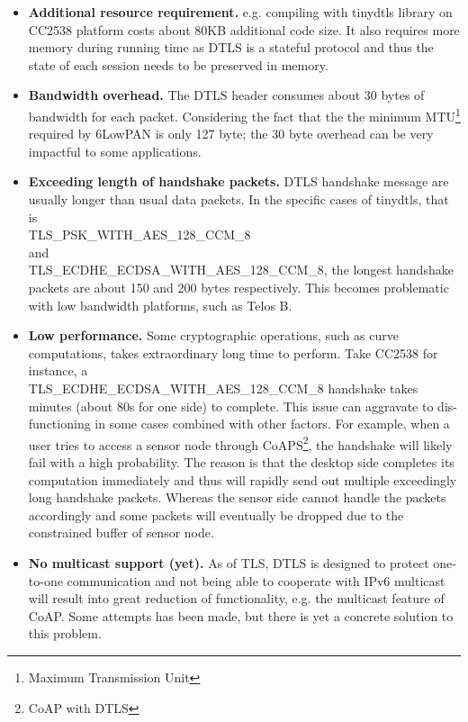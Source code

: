 \begin{itemize}
\item \textbf{Additional resource requirement.} e.g. compiling with tinydtls library on CC2538 platform costs about 80KB additional code size. It also requires more memory during running time as DTLS is a stateful protocol and thus the state of each session needs to be preserved in memory.
\item \textbf{Bandwidth overhead.} The DTLS header consumes about 30 bytes of bandwidth for each packet. Considering the fact that the the minimum MTU\footnote{Maximum Transmission Unit} required by 6LowPAN is only 127 byte; the 30 byte overhead can be very impactful to some applications. 
\item \textbf{Exceeding length of handshake packets.} DTLS handshake message are usually longer than usual data packets. In the specific cases of tinydtls, that is\\ TLS\_PSK\_WITH\_AES\_128\_CCM\_8 \\
and \\
TLS\_ECDHE\_ECDSA\_WITH\_AES\_128\_CCM\_8, the longest handshake packets are about 150 and 200 bytes respectively. This becomes problematic with low bandwidth platforms, such as Telos B.
\item\textbf{Low performance.} Some cryptographic operations, such as curve computations, takes extraordinary long time to perform. Take  CC2538 for instance, a \\ TLS\_ECDHE\_ECDSA\_WITH\_AES\_128\_CCM\_8 handshake takes minutes (about 80s for one side) to complete. This issue can aggravate to dis-functioning in some cases combined with other factors. For example, when a user tries to access a sensor node through CoAPS\footnote{CoAP with DTLS}, the handshake will likely fail with a high probability. The reason is that the desktop side completes its computation immediately and thus will rapidly send out multiple exceedingly long handshake packets. Whereas the sensor side cannot handle the packets accordingly and some packets will eventually be dropped due to the constrained buffer of sensor node.
\item \textbf{No multicast support (yet).} As of TLS, DTLS is designed to protect one-to-one communication and not being able to cooperate with IPv6 multicast will result into great reduction of functionality, e.g. the multicast feature of CoAP. Some attempts\cite{multicast1}\cite{multicast2} has been made, but there is yet a concrete solution to this problem.
\end{itemize}


